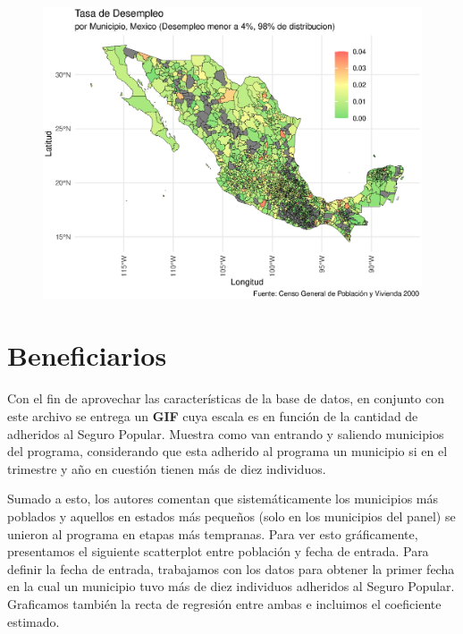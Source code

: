 \documentclass[9pt]{article}
\begin{document}
 \begin{figure}[H]
     \centering
     \includegraphics[width=\textwidth]{figs/unemployement.eps}
 \end{figure}
\newpage
\section*{Beneficiarios}
Con el fin de aprovechar las caracter\'isticas de la base de datos, en conjunto con este archivo se entrega un \textbf{GIF} cuya escala es en funci\'on de la cantidad de adheridos al Seguro Popular. Muestra como van entrando y saliendo municipios del programa, considerando que esta adherido al programa un municipio si en el trimestre y a\~no en cuesti\'on tienen m\'as de diez individuos. 


Sumado a esto, los autores comentan que sistemáticamente los municipios más poblados y aquellos en estados más pequeños (solo en los municipios del panel) se unieron al programa en etapas más tempranas. Para ver esto gr\'aficamente, presentamos el siguiente scatterplot entre poblaci\'on y fecha de entrada. Para definir la fecha de entrada, trabajamos con los datos para obtener la primer fecha en la cual un municipio tuvo m\'as de diez individuos adheridos al Seguro Popular. Graficamos tambi\'en la recta de regresi\'on entre ambas e incluimos el coeficiente estimado. 
\end{document}
